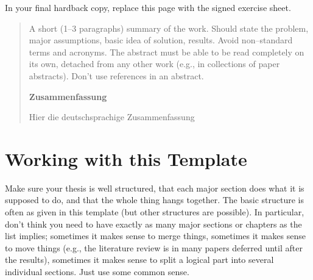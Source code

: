 \documentclass[a4paper,twoside, openright,12pt]{report}
\begin{document}
\phantom{u}
\phantom{1}\vspace{6cm}
\begin{center}
In your final hardback copy, replace this page with the signed exercise sheet.
\end{center}

\newpage


\phantom{u}
\begin{abstract}
  A short (1--3 paragraphs) summary of the work. Should state the problem, major assumptions, basic idea of solution, results. Avoid non--standard terms and acronyms. The abstract must be able to be read completely on its own, detached from any other work (e.g., in collections of paper abstracts). Don't use references in an abstract.
\begin{center}	
\normalsize \textbf{Zusammenfassung}\\
\end{center}
Hier die deutschsprachige Zusammenfassung
\end{abstract}

\newpage

\phantom{u}
\phantom{1}\vspace{6cm}
\begin{center}
\end{center}



\pagestyle{fancy}

\tableofcontents 


\chapter{Working with this Template}

Make sure your thesis is well structured, that each major section does what it is supposed to do, and that the whole thing hangs together. The basic structure is often as given in this template (but other structures are possible). In particular, don't think you need to have exactly as many major sections or chapters as the list implies; sometimes it makes sense to merge things, sometimes it makes sense to move things (e.g., the literature review is in many papers deferred until after the results), sometimes it makes sense to split a logical part into several individual sections. Just use some common sense.
\end{document}
